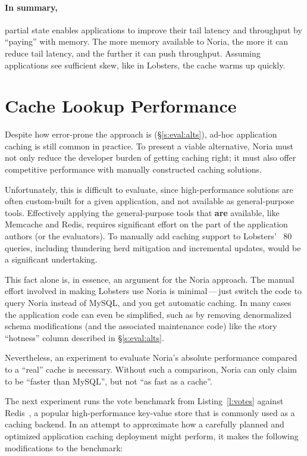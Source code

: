 \paragraph{In summary,} partial state enables applications to improve their
tail latency and throughput by ``paying'' with memory. The more memory available
to Noria, the more it can reduce tail latency, and the further it can push
throughput. Assuming applications see sufficient skew, like in Lobsters, the
cache warms up quickly.

\section{Cache Lookup Performance}
\label{s:eval:kvperf}

Despite how error-prone the approach is (\S\ref{s:eval:alts}), ad-hoc
application caching is still common in practice. To present a viable
alternative, Noria must not only reduce the developer burden of getting caching
right; it must also offer competitive performance with manually constructed
caching solutions.

Unfortunately, this is difficult to evaluate, since high-performance solutions
are often custom-built for a given application, and not available as
general-purpose tools. Effectively applying the general-purpose tools that
\textbf{are} available, like Memcache and Redis, requires significant effort on
the part of the application authors (or the evaluators). To manually add caching
support to Lobsters' ~80 queries, including thundering herd mitigation and
incremental updates, would be a significant undertaking.

This fact alone is, in essence, an argument for the Noria approach. The manual
effort involved in making Lobsters use Noria is minimal\,---\,just switch the
code to query Noria instead of MySQL, and you get automatic caching. In many
cases the application code can even be simplified, such as by removing
denormalized schema modifications (and the associated maintenance code) like the
story ``hotness'' column described in \S\ref{s:eval:alts}.

Nevertheless, an experiment to evaluate Noria's absolute performance compared to
a ``real'' cache is necessary. Without such a comparison, Noria can only claim
to be ``faster than MySQL'', but not ``as fast as a cache''.

The next experiment runs the vote benchmark from Listing~\vref{l:votes} against
Redis~\cite{redis}, a popular high-performance key-value store that is commonly
used as a caching backend. In an attempt to approximate how a carefully planned
and optimized application caching deployment might perform, it makes the
following modifications to the benchmark:

